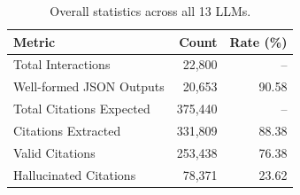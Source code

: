 \begin{table}[t]
\centering
\caption{Overall statistics across all 13 LLMs.}
\label{tab:overall_stats}
\small
{}
\begin{tabular}{lrr}
\toprule
\textbf{Metric} & \textbf{Count} & \textbf{Rate (\%)} \\
\midrule
Total Interactions & 22,800 & -- \\
Well-formed JSON Outputs & 20,653 & 90.58 \\
Total Citations Expected & 375,440 & -- \\
Citations Extracted & 331,809 & 88.38 \\
Valid Citations & 253,438 & 76.38 \\
Hallucinated Citations & 78,371 & 23.62 \\
\bottomrule
\end{tabular}
\end{table}

